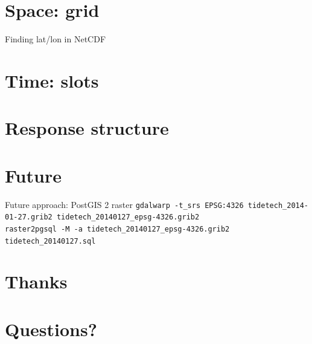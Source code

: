 \documentclass[xcolor=svgnames]{beamer}
\begin{document}
\section{Space: grid}

    \begin{frame}{Finding lat/lon in NetCDF}
        \begin{center}
            \resizebox{0.9\textwidth}{!}{%
                \begin{tikzpicture}
                    
                \end{tikzpicture}
            }
        \end{center}
    \end{frame}

\section{Time: slots}

    \begin{frame}
    \end{frame}

\section{Response structure}

    \begin{frame}
    \end{frame}

\section{Future}

    \begin{frame}{Future approach: PostGIS 2 raster}
        \tiny{
            \texttt{gdalwarp -t\_srs EPSG:4326 tidetech\_2014-01-27.grib2 tidetech\_20140127\_epsg-4326.grib2}\\
            \texttt{raster2pgsql -M -a tidetech\_20140127\_epsg-4326.grib2 tidetech\_20140127.sql}
    }
    \end{frame}

\section{Thanks}

    \begin{frame}
    \end{frame}

\section{Questions?}

    \begin{frame}
    \end{frame}
\end{document}
